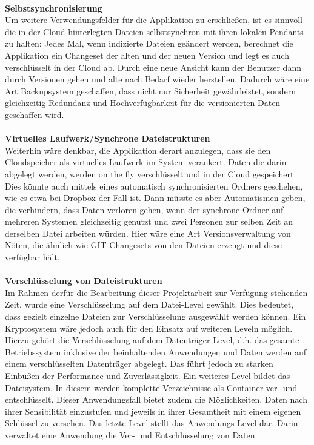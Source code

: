 \documentclass[13pt,a4paper,bibliography=totocnumbered,listof=totocnumbered]{scrartcl}
\begin{document}
\\\textbf{Selbstsynchronisierung}\\
Um weitere Verwendungsfelder für die Applikation zu erschließen, ist es sinnvoll die in der Cloud hinterlegten Dateien selbstsynchron mit ihren lokalen Pendants zu halten: Jedes Mal, wenn indizierte Dateien geändert werden, berechnet die Applikation ein Changeset der alten und der neuen Version und legt es auch verschlüsselt in der Cloud ab. Durch eine neue Ansicht kann der Benutzer dann durch Versionen gehen und alte nach Bedarf wieder herstellen. Dadurch wäre eine Art Backupsystem geschaffen, dass nicht nur Sicherheit gewährleistet, sondern gleichzeitig Redundanz und Hochverfügbarkeit für die versionierten Daten geschaffen wird.\\
\\\textbf{Virtuelles Laufwerk/Synchrone Dateistrukturen}\\
Weiterhin wäre denkbar, die Applikation derart anzulegen, dass sie den Cloudspeicher als virtuelles Laufwerk im System verankert. Daten die darin abgelegt werden, werden on the fly verschlüsselt und in der Cloud gespeichert. Dies könnte auch mittels eines automatisch synchronisierten Ordners geschehen, wie es etwa bei Dropbox der Fall ist. Dann müsste es aber Automatismen geben, die verhindern, dass Daten verloren gehen, wenn der synchrone Ordner auf mehreren Systemen gleichzeitig genutzt und zwei Personen zur selben Zeit an derselben Datei arbeiten würden. Hier wäre eine Art Versionsverwaltung von Nöten, die ähnlich wie GIT Changesets von den Dateien erzeugt und diese verfügbar hält.\\
\\\textbf{Verschlüsselung von Dateistrukturen}\\
Im Rahmen derfür die Bearbeitung dieser Projektarbeit zur Verfügung stehenden Zeit, wurde eine Verschlüsselung auf dem Datei-Level gewählt. Dies bedeutet, dass gezielt einzelne Dateien zur Verschlüsselung ausgewählt werden können. Ein Kryptosystem wäre jedoch auch für den Einsatz auf weiteren Leveln möglich. Hierzu gehört die Verschlüsselung auf dem Datenträger-Level, d.h. das gesamte Betriebssystem inklusive der beinhaltenden Anwendungen und Daten werden auf einem verschlüsselten Datenträger abgelegt. Das führt jedoch zu starken Einbußen der Performance und Zuverlässigkeit. Ein weiteres Level bildet das Dateisystem. In diesem werden komplette Verzeichnisse als Container ver- und entschlüsselt. Dieser Anwendungsfall bietet zudem die Möglichkeiten, Daten nach ihrer Sensibilität einzustufen und jeweils in ihrer Gesamtheit mit einem eigenen Schlüssel zu versehen. Das letzte Level stellt das Anwendungs-Level dar. Darin verwaltet eine Anwendung die Ver- und Entschlüsselung von Daten. \cite[S. 141f]{38}\\
\end{document}

